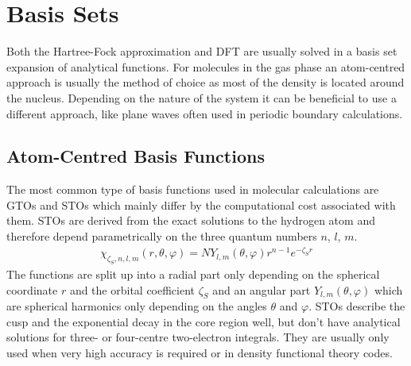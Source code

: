 \section{Basis Sets}
\label{sec:basissets}

Both the Hartree-Fock approximation and \ac{DFT} are usually solved in a basis
set expansion of analytical functions. For molecules in the gas phase an atom-centred approach is
usually the method of choice as most of the density is located around the nucleus. 
Depending on the nature of the system it can be
beneficial to use a different approach, like plane waves often used in
periodic boundary calculations.

\subsection{Atom-Centred Basis Functions}
\label{sec:AtomCentredBasisFunctions}

The most common type of basis functions used in molecular calculations are
\acp{GTO} and \acp{STO} which mainly differ by the computational cost associated
with them. \acp{STO} are derived from the exact solutions to the hydrogen atom
and therefore depend parametrically on the three quantum numbers $n$,
$l$, $m$.
%
\begin{align}
    \chi_{\zeta_S,n,l,m}(r,\theta,\varphi) = NY_{l,m}(\theta,\varphi)r^{n-1}e^{-\zeta_S r}
\end{align}
%
The functions are split up into a radial part only depending on the spherical
coordinate $r$ and the orbital coefficient $\zeta_S$ and an angular part
$Y_{l,m}(\theta,\varphi)$ which are spherical harmonics only depending on the
angles $\theta$ and $\varphi$. \acp{STO} describe the cusp and the exponential
decay in the core region well, but don't have analytical solutions for three-
or four-centre two-electron integrals. They are usually only used when very high accuracy
is required or in density functional theory codes.

